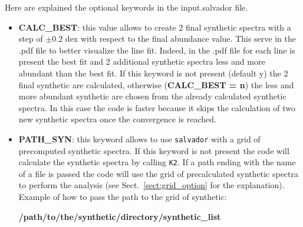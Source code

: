 \documentclass[modern]{aastex701}
\begin{document}
Here are explained the optional keywords in the input.salvador file. 
\begin{itemize}
    \item {\bf CALC\_BEST}: this value allows to create 2 final synthetic spectra with a step of $\pm 0.2$ dex with respect to the final abundance value. This serve in the .pdf file to better visualize the line fit. Indeed, in the .pdf file for each line is present the best fit and 2 additional synthetic spectra less and more abundant than the best fit.    
    If this keyword is not present (default y) the 2 final synthetic are calculated, otherwise ({\bf CALC\_BEST = n}) the less and more abundant synthetic are chosen from the already calculated synthetic spectra. In this case the code is faster because it skips the calculation of two new synthetic spectra once the convergence is reached.   

    \item {\bf PATH\_SYN}: this keyword allows to use \texttt{salvador} with a grid of precomputed synthetic spectra. If this keyword is not present the code will calculate the synthetic spectra by calling \texttt{K2}. 
    If a path ending with the name of a file is passed the code will use the grid of precalculated synthetic spectra to perform the analysis (see Sect.~\ref{sect:grid_option} for the explanation). Example of how to pass the path to the grid of synthetic:  
    
        \textbf{/path/to/the/synthetic/directory/synthetic\_list} 
        

\end{itemize}
\end{document}
